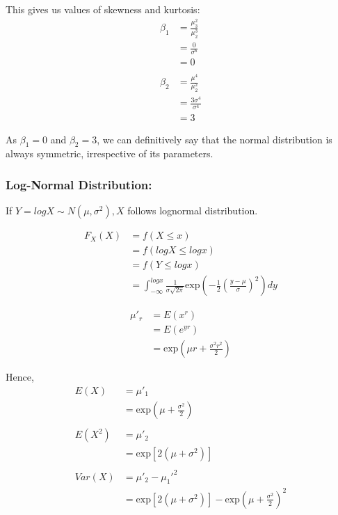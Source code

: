 \documentclass[
10pt, %
a4paper, %
]{report}
\begin{document}
This gives us values of skewness and kurtosis:
\begin{align*}
    \beta_1 &= \frac{\mu_3^2}{\mu_2^3} \\
            &= \frac{0}{\sigma^6} \\
            &= 0 \\ \\
    \beta_2 &= \frac{\mu^4}{\mu_2^2} \\
            &= \frac{3\sigma^4}{\sigma^4} \\
            &= 3
\end{align*}

As \(\beta_1=0\) and \(\beta_2=3\), we can definitively say that the normal distribution is always symmetric, irrespective of its parameters.


\subsubsection*{Log-Normal Distribution:}
If \(Y=logX \sim N(\mu, \sigma^2), X\) follows lognormal distribution. 

\begin{align*}
    F_X(X) &= f(X\leq x) \\
           &= f(logX\leq logx) \\
           &= f(Y\leq logx) \\
           &= \int_{-\infty}^{logx} \frac{1}{\sigma\sqrt{2\pi}}\text{exp}\left(-\frac{1}{2} \left(\frac{y-\mu}{\sigma}\right)^2\right)dy
\end{align*}

\begin{align*}
    \mu'_r &= E(x^r) \\
           &= E(e^{yr}) \\
           &= \text{exp}\left( \mu r + \frac{\sigma^2 r^2}{2} \right)
\end{align*}

Hence, 
\begin{align*}
    E(X)    &= \mu'_1 \\
            &= \text{exp}\left( \mu + \frac{\sigma^2}{2} \right) \\\\
    E(X^2)  &= \mu'_2 \\
            &= \text{exp}[2(\mu + \sigma^2)] \\\\
    Var(X)  &= \mu'_2 - \mu_1'^2 \\
            &= \text{exp}[2(\mu + \sigma^2)] - \text{exp}\left( \mu + \frac{\sigma^2}{2} \right)^2
\end{align*}
\end{document}

